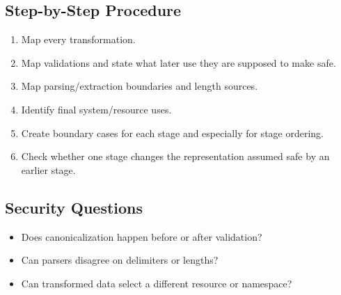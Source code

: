 \documentclass[10pt]{article}
\begin{document}
\subsection*{Step-by-Step Procedure}
\begin{enumerate}
\item Map every transformation.
\item Map validations and state what later use they are supposed to make safe.
\item Map parsing/extraction boundaries and length sources.
\item Identify final system/resource uses.
\item Create boundary cases for each stage and especially for stage ordering.
\item Check whether one stage changes the representation assumed safe by an earlier stage.
\end{enumerate}
\subsection*{Security Questions}
\begin{itemize}
\item Does canonicalization happen before or after validation?
\item Can parsers disagree on delimiters or lengths?
\item Can transformed data select a different resource or namespace?
\end{itemize}

\clearpage
\end{document}

